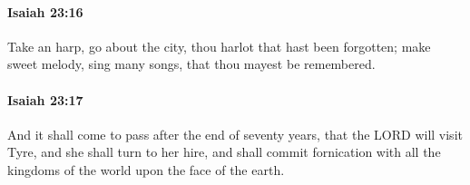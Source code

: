 		\paragraph{Isaiah 23:16} %
			\label{ISAIAH-23-16}

			Take an harp, go about the city, thou harlot that hast been forgotten; make sweet melody, sing many songs, that thou mayest be remembered.


		\paragraph{Isaiah 23:17} %
			\label{ISAIAH-23-17}

			And it shall come to pass after the end of seventy years, that the LORD will visit Tyre, and she shall turn to her hire, and shall commit fornication with all the kingdoms of the world upon the face of the earth.


